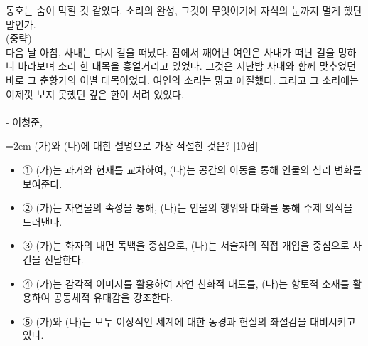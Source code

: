 \documentclass[10pt,a4paper]{article}
\newcommand{\qnum}[1]{%
  \tikz[baseline=(num.base)]{%
    \node[circle, fill=numCircle, text=white, inner sep=0pt,
          minimum size=18pt, font=\small\bfseries] (num) {#1};%
  }%
}
\newcommand{\pts}[1]{%
  \hfill\textcolor{ptsBadge}{[#1점]}%
}
\begin{document}
\begin{tcolorbox}[passage]
동호는 숨이 막힐 것 같았다. 소리의 완성, 그것이 무엇이기에 자식의 눈까지 멀게 했단 말인가. \\{}
(중략) \\{}
다음 날 아침, 사내는 다시 길을 떠났다. 잠에서 깨어난 여인은 사내가 떠난 길을 멍하니 바라보며 소리 한 대목을 흥얼거리고 있었다. 그것은 지난밤 사내와 함께 맞추었던 바로 그 춘향가의 이별 대목이었다. 여인의 소리는 맑고 애절했다. 그리고 그 소리에는 이제껏 보지 못했던 깊은 한이 서려 있었다. \\{}
\vspace{4pt} \\{}
- 이청준,
\end{tcolorbox}
\vspace{3mm}
\begin{minipage}{\columnwidth}
{\hangindent=2em
\qnum{33}\enspace (가)와 (나)에 대한 설명으로 가장 적절한 것은? \pts{10}
\par}

\vspace{3mm}
\begin{itemize}[leftmargin=2.5em, labelsep=0.3em, label={}, itemsep=4pt, parsep=1pt, topsep=0pt]
  \item ① (가)는 과거와 현재를 교차하여, (나)는 공간의 이동을 통해 인물의 심리 변화를 보여준다.
  \item ② (가)는 자연물의 속성을 통해, (나)는 인물의 행위와 대화를 통해 주제 의식을 드러낸다.
  \item ③ (가)는 화자의 내면 독백을 중심으로, (나)는 서술자의 직접 개입을 중심으로 사건을 전달한다.
  \item ④ (가)는 감각적 이미지를 활용하여 자연 친화적 태도를, (나)는 향토적 소재를 활용하여 공동체적 유대감을 강조한다.
  \item ⑤ (가)와 (나)는 모두 이상적인 세계에 대한 동경과 현실의 좌절감을 대비시키고 있다.
\end{itemize}
\end{minipage}
\vspace{4mm}
\end{document}
